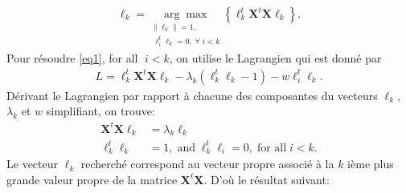 \begin{align}
\mathbf{\ell}_k=\underset{\substack{\|\ell_k\|=1,\\ \;\ell_{i}^{t}\ell_k=0,\;\forall\;i<k}}{\arg \max} \left\{\ell^t_k\mathbf{X}^t \mathbf{X} \ell_k\right\}.\label{eq1}
\end{align}
Pour résoudre \eqref{eq1},  for all $\;i<k$, on utilise le Lagrangien qui  est donné par 
\begin{align*}
L=\ell^t_k\mathbf{X}^t \mathbf{X} \ell_k-\lambda_k(\ell^t_k\ell_k-1)-w\ell_{i}^{t}\ell_k.
\end{align*}
Dérivant le Lagrangien par rapport à chacune des composantes du vecteurs $\ell_k$, $\lambda_k$ et $w$ simplifiant, on trouve: 
\begin{align}
\mathbf{X}^t \mathbf{X} \ell_k&=\lambda_k\ell_k\\
\ell^t_k\ell_k&=1,\; \text{and}\; \ell^t_k\ell_i=0,\;\text{for all}\; i<k.
\end{align}
Le vecteur $\ell_k$ recherché correspond au vecteur propre associé à la $k$ ième plus grande  valeur propre de la matrice $\mathbf{X}^t \mathbf{X}$. D'où le résultat suivant:\

